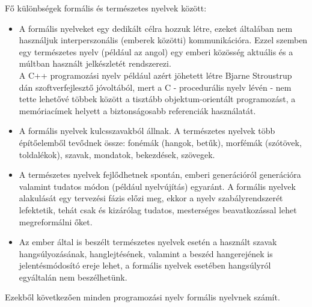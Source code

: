 \documentclass[tocnopagenum]{thesis-ekf}
\theoremstyle{definition}
\theoremstyle{remark}
\begin{document}
	Fő különbségek formális és természetes nyelvek között:
	\begin{itemize}
		\item A formális nyelveket egy dedikált célra hozzuk létre, ezeket általában nem használjuk interperszonális (emberek közötti) kommunikációra. Ezzel szemben egy természetes nyelv (például az angol) egy emberi közösség aktuális és a múltban használt jelkészletét rendszerezi.\\
		A C++ programozási nyelv például azért jöhetett létre Bjarne Stroustrup dán szoftverfejlesztő jóvoltából, mert a C - procedurális nyelv lévén - nem tette lehetővé többek között a tisztább objektum-orientált programozást, a memóriacímek helyett a biztonságosabb referenciák használatát. \cite{cpplang1}
		\item A formális nyelvek kulcsszavakból állnak. A természetes nyelvek több építőelemből tevődnek össze: fonémák (hangok, betűk), morfémák (szótövek, toldalékok), szavak, mondatok, bekezdések, szövegek.
		\item A természetes nyelvek fejlődhetnek spontán, emberi generációról generációra valamint tudatos módon (például nyelvújítás) egyaránt. A formális nyelvek alakulását egy tervezési fázis előzi meg, ekkor a nyelv szabályrendszerét lefektetik, tehát csak és kizárólag tudatos, mesterséges beavatkozással lehet megreformálni őket.
		\item Az ember által is beszélt természetes nyelvek esetén a használt szavak hangsúlyozásának, hanglejtésének, valamint a beszéd hangerejének is jelentésmódosító ereje lehet, a formális nyelvek esetében hangsúlyról egyáltalán nem beszélhetünk.
	\end{itemize} \cite{langvid1} \cite{langvid2}
	Ezekből következően minden programozási nyelv formális nyelvnek számít.
\end{document}
